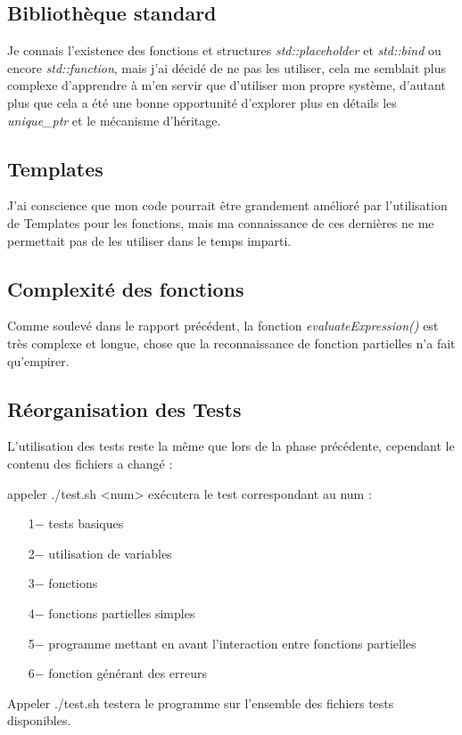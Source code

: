 \documentclass[]{article}
\begin{document}
\subsection{Bibliothèque standard}
Je connais l'existence des fonctions et structures \textit{std::placeholder} et \textit{std::bind} ou encore \textit{std::function}, mais j'ai décidé de ne pas les utiliser, cela me semblait plus complexe d'apprendre à m'en servir que d'utiliser mon propre système, d'autant plus que cela a été une bonne opportunité d'explorer plus en détails les \textit{unique\_ptr} et le mécanisme d'héritage.

\subsection{Templates}
J'ai conscience que mon code pourrait être grandement amélioré par l'utilisation de Templates pour les fonctions, mais ma connaissance de ces dernières ne me permettait pas de les utiliser dans le temps imparti.

\subsection{Complexité des fonctions}
Comme soulevé dans le rapport précédent, la fonction \textit{evaluateExpression()} est très complexe et longue, chose que la reconnaissance de fonction partielles n'a fait qu'empirer.

\subsection{Réorganisation des Tests}
L'utilisation des tests reste la même que lors de la phase précédente, cependant le contenu des fichiers a changé :

appeler ./test.sh <num> exécutera le test correspondant au num :
\begin{itemize}
\item[\hspace{.5cm}1$-$]tests basiques
\item[\hspace{.5cm}2$-$]utilisation de variables
\item[\hspace{.5cm}3$-$]fonctions 
\item[\hspace{.5cm}4$-$]fonctions partielles simples
\item[\hspace{.5cm}5$-$]programme mettant en avant l'interaction entre fonctions partielles
\item[\hspace{.5cm}6$-$]fonction générant des erreurs
\end{itemize}\bigskip
Appeler ./test.sh testera le programme sur l'ensemble des fichiers tests disponibles.
\end{document}
